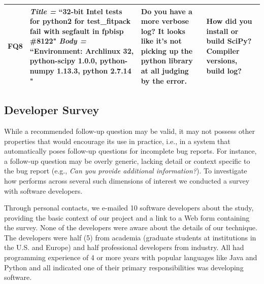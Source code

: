 \begin{table}[t]
\begin{tabular}{ |M{1cm}|p{7.3cm}|p{4cm}|p{4cm}|  }
		
		FQ8
		&{\em Title =} ``32-bit Intel tests for python2 for test\_fitpack fail with segfault in fpbisp \#8122" \newline
		{\em Body =} ``Environment: Archlinux 32, python-scipy 1.0.0, python-numpy 1.13.3, python 2.7.14 \newline
		[...]"
		& Do you have a more verbose log? It looks like it's not picking up the python library at all judging by the error. 
		& How did you install or build SciPy? Compiler versions, build log? \\ \hline
		
	\end{tabular}
\label{tab:survey}
\end{table}


\subsection{Developer Survey}
While a recommended follow-up question may be valid, it may not possess other properties that would
encourage its use in practice, i.e., in a system that automatically poses follow-up questions for incomplete bug reports. For
instance, a follow-up question may be overly generic, lacking detail or context specific to the bug report (e.g., {\em Can you provide
additional information?}). To investigate how \evpi performs across several such dimensions of interest we conducted a survey with
software developers.

Through personal contacts, we e-mailed 10 software developers about the study, providing the basic context of our project
and a link to a Web form containing the survey. None of the developers were
aware about the details of our technique. The developers were half (5) from academia (graduate students at
institutions in the U.S. and Europe) and half professional developers from industry. All had programming
experience of 4 or more years with popular languages like Java and Python and all indicated one of their primary
responsibilities was developing software.

